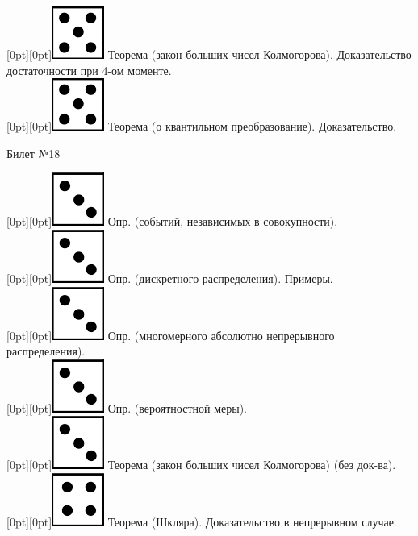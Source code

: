 \documentclass[10pt]{article}
\begin{document}
\raisebox{-1pt}[0pt][0pt]{\includegraphics[width=0.02\linewidth]{5.png}} Теорема (закон больших чисел Колмогорова). Доказательство достаточности при 4-ом моменте. \\

\raisebox{-1pt}[0pt][0pt]{\includegraphics[width=0.02\linewidth]{5.png}}  Теорема (о квантильном преобразование). Доказательство. \\

\begin{center} {\Large Билет №18} \end{center} 

\raisebox{-1pt}[0pt][0pt]{\includegraphics[width=0.02\linewidth]{3.png}} Опр. (событий, независимых в совокупности). \\

\raisebox{-1pt}[0pt][0pt]{\includegraphics[width=0.02\linewidth]{3.png}} Опр. (дискретного распределения). Примеры. \\

\raisebox{-1pt}[0pt][0pt]{\includegraphics[width=0.02\linewidth]{3.png}} Опр. (многомерного абсолютно непрерывного распределения). \\

\raisebox{-1pt}[0pt][0pt]{\includegraphics[width=0.02\linewidth]{3.png}} Опр. (вероятностной меры). \\

\raisebox{-1pt}[0pt][0pt]{\includegraphics[width=0.02\linewidth]{3.png}} Теорема (закон больших чисел Колмогорова) (без док-ва). \\

\raisebox{-1pt}[0pt][0pt]{\includegraphics[width=0.02\linewidth]{4.png}} Теорема (Шкляра). Доказательство в непрерывном случае. \\
\end{document}
